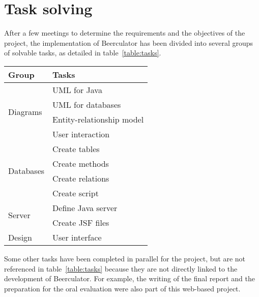 \section{Task solving}
\label{sec:task}

After a few meetings to determine the requirements and the objectives of the project, the implementation of Beerculator has been divided into several groups of solvable tasks, as detailed in {\sc table}~\ref{table:tasks}.

\begin{center}
\begin{tabular}{|l|l|}
  \hline
  \textbf{Group} & \textbf{Tasks}\\ \hline
  \multirow{4}{*}{Diagrams} & UML for Java \\
    & UML for databases \\
    & Entity-relationship model \\
    & User interaction \\ \hline
  \multirow{4}{*}{Databases} & Create tables \\
    & Create methods \\
    & Create relations \\ 
    & Create script \\ \hline
  \multirow{2}{*}{Server} & Define Java server \\
    & Create JSF files \\
 \hline
    Design & User interface\\
    \hline
\end{tabular}
\label{table:tasks}
\end{center}

Some other tasks have been completed in parallel for the project, but are not referenced in {\sc table}~\ref{table:tasks} because they are not directly linked to the development of Beerculator. For example, the writing of the final report and the preparation for the oral evaluation were also part of this web-based project.
